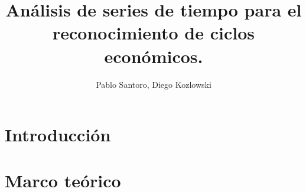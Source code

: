 \documentclass[a4paper]{article}
\title{Análisis de series de tiempo para el reconocimiento de ciclos económicos.}
\author{Pablo Santoro, Diego Kozlowski}
\begin{document}
\maketitle

\begin{abstract}
	
\end{abstract}

\section{Introducción}

\section{Marco teórico}
\end{document}
